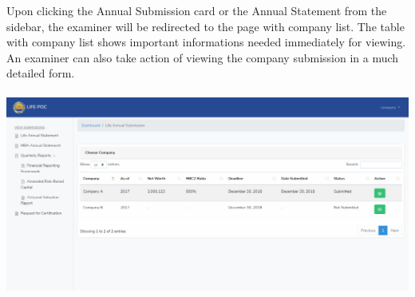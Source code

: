 \documentclass{article}
\begin{document}
Upon clicking the Annual Submission card or the Annual
Statement from the sidebar, the examiner will be redirected to the page
with company list. The table with company list shows important
informations needed immediately for viewing. An examiner can also take
action of viewing the company submission in a much detailed form.%

\paragraph{\includegraphics[keepaspectratio=true]{up-ic-screens/image95}{}}\label{sec-up-ic-screensimage95png}%

\paragraph{ }\label{sec--}%

\paragraph{ }\label{sec--}%

\paragraph{ }\label{sec--}%

\paragraph{ }\label{sec--}%

\paragraph{ }\label{sec--}%
\end{document}
